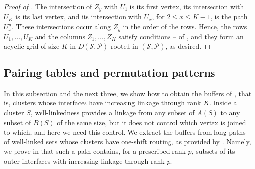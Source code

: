 \documentclass[fontsize=12pt,leading=14pt]{fullpaper}
\newcommand{\Pcal}{\mathcal{P}}
\newcommand{\Scal}{\mathcal{S}}
\begin{document}
\begin{proof}[Proof of ]
  The intersection of $Z_y$ with $U_1$ is its first vertex, its intersection with $U_K$ is its last vertex, and its intersection with $U_x$, for $2\le x\le K-1$, is the path $U^y_x$.
  These intersections occur along $Z_y$ in the order of the rows.
  Hence, the rows $U_1,\dots,U_K$ and the columns $Z_1,\dots,Z_K$ satisfy conditions -- of , and they form an acyclic grid of size $K$ in $D(\Scal,\Pcal)$ rooted in $(\Scal,\Pcal)$, as desired.
\end{proof}

%
\newcommand{\pato}{\operatorname{pat}}
\newcommand{\Sy}{\mathfrak{S}}
\newcommand{\spos}{\operatorname{pos}}

\subsection{Pairing tables and permutation patterns}\label{sec:s3-pairing}

In this subsection and the next three, we show how to obtain the buffers of , that is, clusters whose interfaces have increasing linkage through rank $K$.
Inside a cluster $S$, well-linkedness provides a linkage from any subset of $A(S)$ to any subset of $B(S)$ of the same size, but it does not control which vertex is joined to which, and here we need this control.
We extract the buffers from long paths of well-linked sets whose clusters have one-shift routing, as provided by .
Namely, we prove in  that such a path contains, for a prescribed rank $p$, subsets of its outer interfaces with increasing linkage through rank $p$.
\end{document}
